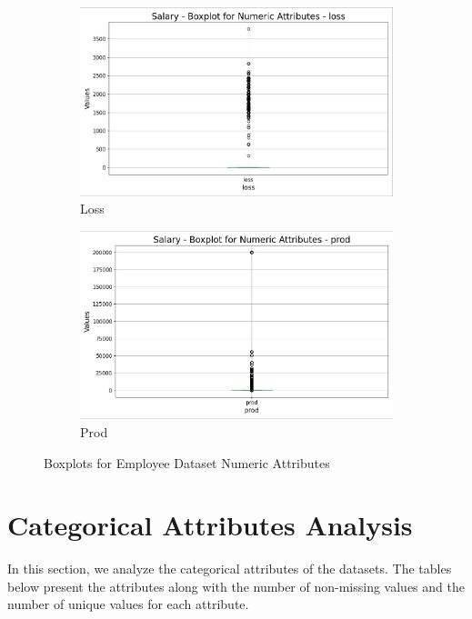 \documentclass[a4paper,12pt]{article}
\begin{document}
\begin{figure}[h!]
    \begin{subfigure}[b]{0.45\textwidth}
        \centering
        \includegraphics[width=\textwidth]{Resources/Boxplot_loss.jpeg}
        \caption{Loss}
        \label{fig:loss}
    \end{subfigure}
    \hfill
    \begin{subfigure}[b]{0.45\textwidth}
        \centering
        \includegraphics[width=\textwidth]{Resources/Boxplot_prod.jpeg}
        \caption{Prod}
        \label{fig:prod}
    \end{subfigure}
    
    \caption{Boxplots for Employee Dataset Numeric Attributes}
\end{figure}

\newpage

\section{Categorical Attributes Analysis}

In this section, we analyze the categorical attributes of the datasets. The tables below present the attributes along with the number of non-missing values and the number of unique values for each attribute.
\end{document}
